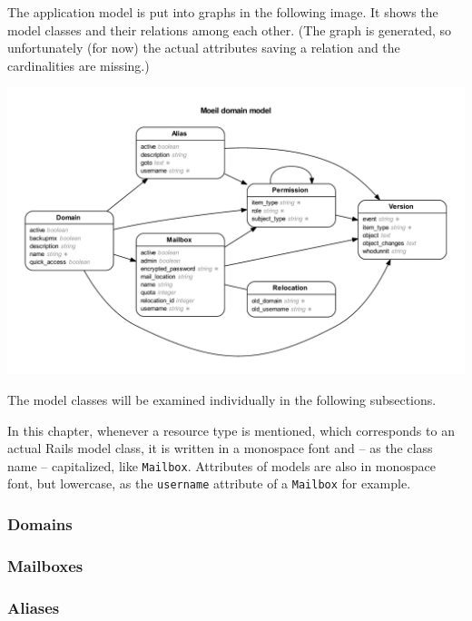 \documentclass[12pt,a4paper]{scrartcl}
\begin{document}
			The application model is put into graphs in the following image. It
			shows the model classes and their relations among each other. (The
			graph is generated, so unfortunately (for now) the actual
			attributes saving a relation and the cardinalities are missing.)

			\includegraphics[width=\textwidth]{images/erd.pdf}

			The model classes will be examined individually in the following
			subsections.
			\s

			In this chapter, whenever a resource type is mentioned, which
			corresponds to an actual \ac{Rails} model class, it is written in a
			monospace font and -- as the class name -- capitalized, like
			\texttt{Mailbox}. Attributes of models are also in monospace font,
			but lowercase, as the \texttt{username} attribute of a
			\texttt{Mailbox} for example.

			\subsubsection*{Domains}

			\subsubsection*{Mailboxes}

			\subsubsection*{Aliases}
\end{document}
